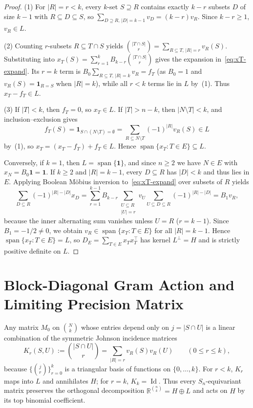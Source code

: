 \documentclass[11pt]{article}
\theoremstyle{plain}
\theoremstyle{definition}
\theoremstyle{remark}
\DeclareMathOperator{\spn}{span}
\DeclareMathOperator{\Id}{Id}
\begin{document}
\begin{proof}
(1) For $|R| = r < k$, every $k$-set $S \supseteq R$ contains exactly $k - r$ subsets $D$ of size $k - 1$ with $R \subseteq D \subseteq S$, so $\sum_{D \supseteq R,\, |D| = k-1} v_D = (k - r)v_R$. Since $k - r \ge 1$, $v_R \in L$.

(2) Counting $r$-subsets $R \subseteq T \cap S$ yields $\binom{|T \cap S|}{r} = \sum_{R \subseteq T,\, |R|=r} v_R(S)$. Substituting into $x_T(S) = \sum_{r=1}^k B_{k-r}\binom{|T \cap S|}{r}$ gives the expansion in~\eqref{eq:xT-expand}. Its $r = k$ term is $B_0 \sum_{R \subseteq T,\, |R|=k} v_R = f_T$ (as $B_0 = 1$ and $v_R(S) = \mathbf{1}_{R=S}$ when $|R|=k$), while all $r < k$ terms lie in $L$ by~(1). Thus $x_T - f_T \in L$.

(3) If $|T| < k$, then $f_T = 0$, so $x_T \in L$. If $|T| > n - k$, then $|N \setminus T| < k$, and inclusion--exclusion gives
\[
f_T(S) = \mathbf{1}_{S \cap (N \setminus T) = \emptyset} = \sum_{R \subseteq N \setminus T} (-1)^{|R|} v_R(S) \in L
\]
by~(1), so $x_T = (x_T - f_T) + f_T \in L$. Hence $\spn\{x_T : T \in E\} \subseteq L$.

Conversely, if $k = 1$, then $L = \spn\{\mathbf{1}\}$, and since $n \ge 2$ we have $N \in E$ with $x_N = B_0 \mathbf{1} = \mathbf{1}$. If $k \ge 2$ and $|R| = k - 1$, every $D \subseteq R$ has $|D| < k$ and thus lies in $E$. Applying Boolean M\"obius inversion to~\eqref{eq:xT-expand} over subsets of $R$ yields
\[
\sum_{D \subseteq R} (-1)^{|R| - |D|} x_D
= \sum_{r=1}^{k-1} B_{k-r} \sum_{\substack{U \subseteq R \\ |U| = r}} v_U \sum_{U \subseteq D \subseteq R} (-1)^{|R| - |D|}
= B_1 v_R,
\]
because the inner alternating sum vanishes unless $U = R$ ($r = k - 1$). Since $B_1 = -1/2 \neq 0$, we obtain $v_R \in \spn\{x_T : T \in E\}$ for all $|R| = k - 1$. Hence $\spn\{x_T : T \in E\} = L$, so $D_E = \sum_{T \in E} x_T x_T^\top$ has kernel $L^\perp = H$ and is strictly positive definite on $L$.
\end{proof}

\section{Block-Diagonal Gram Action and Limiting Precision Matrix}

Any matrix $M_0$ on $\binom{N}{k}$ whose entries depend only on $j = |S \cap U|$ is a linear combination of the symmetric Johnson incidence matrices
\[
K_r(S, U) := \binom{|S \cap U|}{r} = \sum_{|R| = r} v_R(S) v_R(U) \qquad (0 \le r \le k),
\]
because $\bigl\{\binom{j}{r}\bigr\}_{r=0}^k$ is a triangular basis of functions on $\{0, \dots, k\}$. For $r < k$, $K_r$ maps into $L$ and annihilates $H$; for $r = k$, $K_k = \Id$. Thus every $S_n$-equivariant matrix preserves the orthogonal decomposition $\mathbb{R}^{\binom{n}{k}} = H \oplus L$ and acts on $H$ by its top binomial coefficient.
\end{document}
